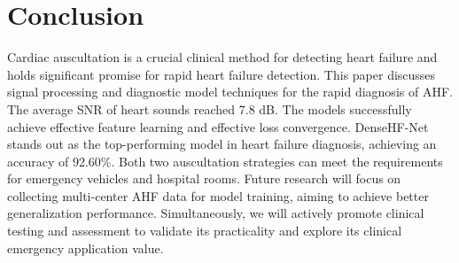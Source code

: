 \section{Conclusion}\label{Conclusion}
Cardiac auscultation is a crucial clinical method for detecting heart failure and holds significant promise for rapid heart failure detection. This paper discusses signal processing and diagnostic model techniques for the rapid diagnosis of AHF. The average SNR of heart sounds reached 7.8 dB. The models successfully achieve effective feature learning and effective loss convergence. DenseHF-Net stands out as the top-performing model in heart failure diagnosis, achieving an accuracy of 92.60\%. Both two auscultation strategies can meet the requirements for emergency vehicles and hospital rooms. Future research will focus on collecting multi-center AHF data for model training, aiming to achieve better generalization performance. Simultaneously, we will actively promote clinical testing and assessment to validate its practicality and explore its clinical emergency application value.